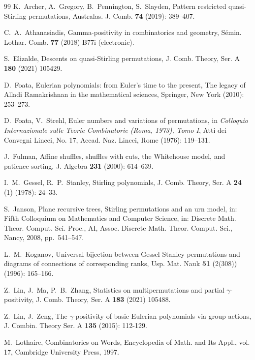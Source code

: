 \documentclass[11pt,reqno]{amsart}
\numberwithin{equation}{section}
\theoremstyle{plain}
\theoremstyle{definition}
\begin{document}
\begin{thebibliography}{99}
 K.~Archer, A.~Gregory, B.~Pennington, S.~Slayden, Pattern restricted quasi-Stirling permutations, Australas. J. Comb. {\bf 74} (2019): 389--407.

 C.~A.~Athanasiadis, Gamma-positivity in combinatorics and geometry, S\'emin. Lothar. Comb. {\bf 77} (2018) B77i (electronic).





 S.~Elizalde, Descents on quasi-Stirling permutations, J. Comb. Theory, Ser. A {\bf 180} (2021) 105429.

 D.~Foata, Eulerian polynomials: from Euler's time to the present, The legacy of Alladi Ramakrishnan in the mathematical sciences, Springer, New York (2010): 253--273.

 D.~Foata, V.~Strehl, Euler numbers and variations of permutations, in \textit{Colloquio Internazionale sulle Teorie Combinatorie (Roma, 1973), Tomo I}, Atti dei Convegni Lincei, No. 17, Accad. Naz. Lincei, Rome (1976): 119--131.

 J.~Fulman, Affine shuffles, shuffles with cuts, the Whitehouse model, and patience sorting, J. Algebra {\bf 231} (2000): 614--639.

 I.~M.~Gessel, R.~P.~Stanley, Stirling polynomials, J. Comb. Theory, Ser. A {\bf 24} (1) (1978): 24--33.

 S.~Janson, Plane recursive trees, Stirling permutations and an urn model, in: Fifth Colloquium on Mathematics and Computer Science, in: Discrete Math. Theor. Comput. Sci. Proc., AI, Assoc. Discrete Math. Theor. Comput. Sci., Nancy, 2008, pp.~541--547.

 L.~M.~Koganov, Universal bijection between Gessel-Stanley permutations and diagrams of connections of corresponding ranks, Usp. Mat. Nauk {\bf 51} (2(308)) (1996): 165--166.

 Z.~Lin, J.~Ma, P.~B.~Zhang, Statistics on multipermutations and partial $\gamma$-positivity, J. Comb. Theory, Ser. A {\bf 183} (2021) 105488.

 Z.~Lin, J.~Zeng, The $\gamma$-positivity of basic Eulerian polynomials via group actions, J. Combin. Theory Ser. A {\bf 135} (2015): 112-129.

 M.~Lothaire, Combinatorics on Words, Encyclopedia of Math. and Its Appl., vol. 17, Cambridge University Press, 1997.


\end{thebibliography}
\end{document}
